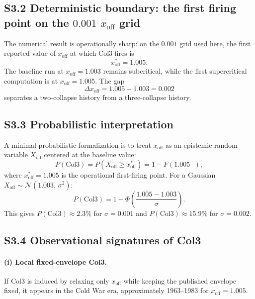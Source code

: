 \documentclass[11pt]{article}
\newcommand{\xoff}{x_{\mathrm{off}}}
\begin{document}
\subsection*{S3.2 Deterministic boundary: the first firing point on the $0.001$ $x_{\mathrm{off}}$ grid}

The numerical result is operationally sharp: on the $0.001$ grid used here, the first reported value of $x_{\mathrm{off}}$ at which Col3 fires is
\begin{equation}
x_{\mathrm{off}}^{\ast} = 1.005.
\end{equation}
The baseline run at $x_{\mathrm{off}}=1.003$ remains subcritical, while the first supercritical computation is at $x_{\mathrm{off}}=1.005$. The gap
\begin{equation}
\Delta x_{\mathrm{off}} = 1.005 - 1.003 = 0.002
\end{equation}
separates a two-collapse history from a three-collapse history.

\subsection*{S3.3 Probabilistic interpretation}

A minimal probabilistic formalization is to treat $x_{\mathrm{off}}$ as an epistemic random variable $X_{\mathrm{off}}$ centered at the baseline value:
\begin{equation}
P(\mathrm{Col3}) = P\!\left(X_{\mathrm{off}} \ge x_{\mathrm{off}}^{\ast}\right)= 1 - F\!\left(1.005^{-}\right),
\end{equation}
where $x_{\mathrm{off}}^{\ast}=1.005$ is the operational first-firing point. For a Gaussian $X_{\mathrm{off}} \sim \mathcal{N}(1.003,\,\sigma^2)$:
\begin{equation}
P(\mathrm{Col3}) = 1 - \Phi\!\left(\frac{1.005-1.003}{\sigma}\right).
\end{equation}
This gives $P(\mathrm{Col3}) \approx 2.3\%$ for $\sigma=0.001$ and $P(\mathrm{Col3}) \approx 15.9\%$ for $\sigma=0.002$.

\subsection*{S3.4 Observational signatures of Col3}

\paragraph{(i) Local fixed-envelope Col3.} If Col3 is induced by relaxing only $\xoff$ while keeping the published envelope fixed, it appears in the Cold War era, approximately 1963--1983 for $x_{\mathrm{off}}=1.005$.
\end{document}
